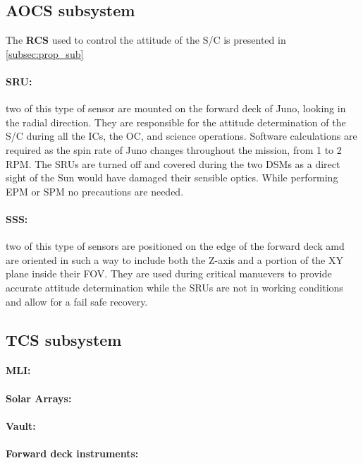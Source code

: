 \subsection{AOCS subsystem}
\label{subsec:aocs_sub}

The \textbf{RCS} used to control the attitude of the S/C is presented in \autoref{subsec:prop_sub}

\vspace{-4mm}

\paragraph{SRU:}two of this type of sensor are mounted on the forward deck of Juno, looking in the radial direction. They are responsible for the attitude determination of the S/C during all the ICs, the OC, and science operations. Software calculations are required as the spin rate of Juno changes throughout the mission, from 1 to 2 RPM. The SRUs are turned off and covered during the two DSMs as a direct sight of the Sun would have damaged their sensible optics. While performing EPM or SPM no precautions are needed. 

\vspace{-4mm}

\paragraph{SSS:}two of this type of sensors are positioned on the edge of the forward deck amd are oriented in such a way to include both the Z-axis and a portion of the XY plane inside their FOV. They are used during critical manuevers to provide accurate attitude determination while the SRUs are not in working conditions and allow for a fail safe recovery. 

\subsection{TCS subsystem}
\label{subsec:tcs_sub}

\paragraph{MLI:} 

\paragraph{Solar Arrays:} 

\vspace{-4mm}

\paragraph{Vault:} 

\vspace{-4mm}

\paragraph{Forward deck instruments:} 

\vspace{-4mm}